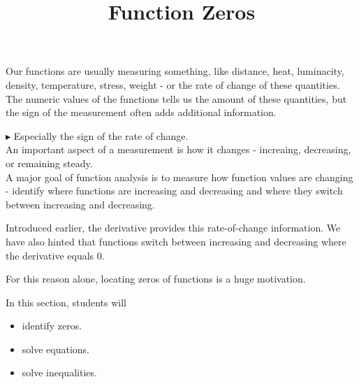 \documentclass{ximera}
\title{Function Zeros}
\begin{document}
\begin{abstract}
\end{abstract}
\maketitle




Our functions are usually measuring something, like distance, heat, luminacity, density, temperature, stress, weight - or the rate of change of these quantities.  The numeric values of the functions tells us the amount of these quantities, but the sign of the measurement often adds additional information. 


$\blacktriangleright$ Especially the sign of the rate of change.  \\



An important aspect of a measurement is how it changes - increaing, decreasing, or remaining steady. \\





A major goal of function analysis is to measure how function values are changing - identify where functions are increasing and decreasing and where they switch between increasing and decreasing.




Introduced earlier, the derivative provides this rate-of-change information.  We have also hinted that functions switch between increasing and decreasing where the derivative equals $0$.

For this reason alone, locating zeros of functions is a huge motivation.










\begin{sectionOutcomes}
In this section, students will 

\begin{itemize}
\item identify zeros.
\item solve equations.
\item solve inequalities.
\end{itemize}
\end{sectionOutcomes}
\end{document}
